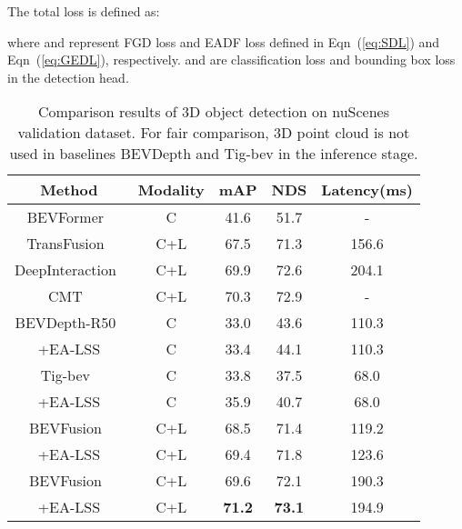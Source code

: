 \documentclass[letterpaper]{article} \usepackage[submission]{aaai24}  \usepackage{times}  \usepackage{helvet}  \usepackage{courier}  \usepackage[hyphens]{url}  \usepackage{graphicx} \urlstyle{rm} \def\UrlFont{\rm}  \usepackage{natbib}  \usepackage{caption} \frenchspacing  \setlength{\pdfpagewidth}{8.5in} \setlength{\pdfpageheight}{11in} \usepackage{algorithm}
\begin{document}
The total loss  is defined as: 

where  and  represent FGD loss and EADF loss defined in Eqn~(\ref{eq:SDL}) and Eqn~(\ref{eq:GEDL}), respectively.   and  are classification loss and bounding box loss in the detection head.

\begin{table*}
\begin{center}
\small
\begin{tabular}{c|c|ccc}
\hline
Method & Modality & mAP  & NDS & Latency(ms)\\
\hline
BEVFormer~\cite{li2022bevformer} & C &  41.6  & 51.7 & -  \\
TransFusion~\cite{bai2022transfusion} & C+L  &	67.5 &	71.3 & 156.6 \\
DeepInteraction~\cite{yang2022deepinteraction} & C+L  &	69.9 &	72.6 &	204.1 \\
CMT~\cite{yan2023cmt} & C+L  &	70.3 &	72.9 &	- \\
\hline
BEVDepth-R50~\cite{li2022bevdepth} & C &	33.0 & 43.6 & 110.3 \\
+EA-LSS  & C  & 33.4 & 44.1 & 110.3 \\

Tig-bev~\cite{huang2022tigbev} & C &	33.8 & 37.5 & 68.0 \\
+EA-LSS  & C  & 35.9 & 40.7 & 68.0 \\
\hline
BEVFusion~\cite{liu2022bevfusion} & C+L  &	 68.5 & 71.4 & 119.2 \\
+EA-LSS & C+L  & 69.4 & 71.8 & 123.6 \\	

BEVFusion~\cite{liang2022bevfusion} & C+L &	69.6  & 72.1 & 190.3 \\
+EA-LSS  & C+L & \textbf{71.2}  &  \textbf{73.1} & 194.9 \\	
\hline
\end{tabular}
\end{center}
\caption{Comparison results of 3D object detection on nuScenes validation dataset. For fair comparison, 3D point cloud is not used in baselines BEVDepth and Tig-bev in the inference stage.}
\label{table:detection_val}
\end{table*}
\end{document}
